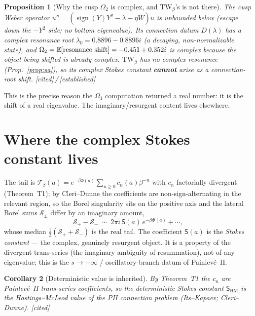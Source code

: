 \documentclass[11pt,reqno]{amsart}
\theoremstyle{plain}\newtheorem{proposition}{Proposition}\newtheorem{corollary}[proposition]{Corollary}
\theoremstyle{remark}\newtheorem{remark}[proposition]{Remark}
\newcommand{\OK}{{\footnotesize\textsf{[established]}}}\newcommand{\cited}{{\footnotesize\textsf{[cited]}}}
\begin{document}
\begin{proposition}[Why the cusp $\Omega_2$ is complex, and $\mathrm{TW}_\beta$'s is not there]\label{prop:cusp}
The cusp Weber operator $u''=(\operatorname{sign}(Y)Y^2-\lambda-\eta\dot W)u$ is \emph{unbounded
below} (escape down the $-Y^2$ side; no bottom eigenvalue). Its connection datum $D(\lambda)$ has a
complex \emph{resonance} root $\lambda_0=0.8896-0.8896i$ (a decaying, non-normalizable state), and
$\Omega_2=\mathbb{E}[\text{resonance shift}]=-0.451+0.352i$ is complex \emph{because the object being
shifted is already complex}. $\mathrm{TW}_\beta$ has no complex resonance
(Prop.~\ref{prop:sa}), so its complex Stokes constant \textbf{cannot} arise as a connection-root
shift. \cited\,/\,\OK
\end{proposition}

This is the precise reason the $\Omega_1$ computation returned a real number: it is the shift of a
real eigenvalue. The imaginary/resurgent content lives elsewhere.

\section{Where the complex Stokes constant lives}

The tail is $\mathcal T_\beta(a)=e^{-\beta\Phi(a)}\sum_{n\ge0}c_n(a)\beta^{-n}$ with $c_n$
factorially divergent (Theorem~T1); by Cleri--Dunne the coefficients are non-sign-alternating in
the relevant region, so the Borel singularity sits on the positive axis and the lateral Borel sums
$\mathcal S_\pm$ differ by an imaginary amount,
\begin{equation}\label{eq:disc}
\mathcal S_+-\mathcal S_-\ \sim\ 2\pi i\,\mathsf S(a)\,e^{-\beta\Phi(a)}+\cdots,
\end{equation}
whose median $\tfrac12(\mathcal S_++\mathcal S_-)$ is the real tail. The coefficient $\mathsf S(a)$
is the \emph{Stokes constant} --- the complex, genuinely resurgent object. It is a property of the
divergent trans-series (the imaginary ambiguity of resummation), not of any eigenvalue; this is the
$s\to-\infty$ / oscillatory-branch datum of Painlev\'e~II.

\begin{corollary}[Deterministic value is inherited]\label{cor:det}
By Theorem~T1 the $c_n$ are Painlev\'e~II trans-series coefficients, so the deterministic Stokes
constant $\mathsf S_{\mathrm{HM}}$ is the Hastings--McLeod value of the PII connection problem
(Its--Kapaev; Cleri--Dunne). \cited
\end{corollary}
\end{document}

